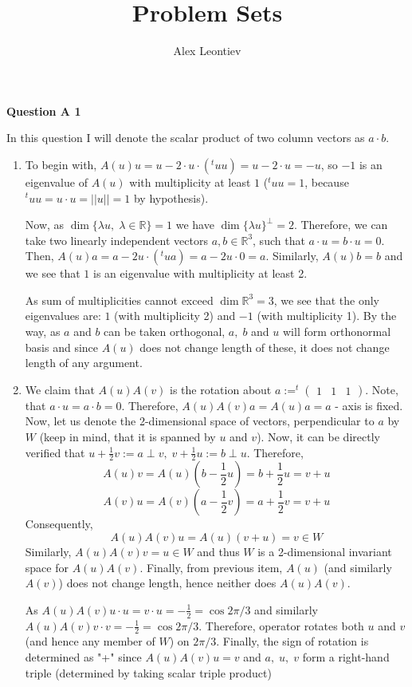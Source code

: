 \documentclass[8pt]{article} %
\title{Problem Sets}
\author{Alex Leontiev}
\newcommand{\mynorm}[1]{\left|\left|#1\right|\right|}
\newcommand{\questionA}[1]{\noindent\textbf{Question A #1}\par}
\begin{document}
\maketitle
\questionA{1}
\indent In this question I will denote the scalar product of two column vectors as $a\cdot b$.
\begin{enumerate}[label=(\arabic*)]
\item{To begin with, $A(u)u=u-2\cdot u\cdot (^t u u)=u-2\cdot u=-u$, so $-1$ is an eigenvalue of 
$A(u)$ with multiplicity at least $1$ ($^tu u=1$, because $^tu u=u\cdot u=\mynorm{u}=1$ by hypothesis).

Now, as $\dim\{\lambda u,\;\lambda\in\mathbb{R}\}=1$ we have $\dim\{\lambda u\}^\perp=2$. Therefore, we can
take two linearly independent vectors $a,b\in\mathbb{R}^3$, such that $a\cdot u=b\cdot u=0$. Then,
$A(u)a=a-2u \cdot (^tu a)=a-2u\cdot 0=a$. Similarly, $A(u)b=b$ and we see that $1$ is an eigenvalue with multiplicity at least 2.

As sum of multiplicities cannot exceed $\dim\mathbb{R}^3=3$, we see that the only eigenvalues are: $1$ (with multiplicity 2) and $-1$
(with multiplicity 1). By the way, as $a$ and $b$ can be taken orthogonal, $a,\;b$ and $u$ will form orthonormal basis and since
$A(u)$ does not change length of these, it does not change length of any argument.
}
\item{We claim that $A(u)A(v)$ is the rotation about $a:=^t \begin{pmatrix}1&1&1\end{pmatrix}$. Note, that $a\cdot u=a\cdot b=0$.
Therefore, $A(u)A(v)a=A(u)a=a$ - axis is fixed. Now, let us denote the 2-dimensional space of vectors, perpendicular to $a$ by $W$ (keep in mind,
that it is spanned by $u$ and $v$). Now, it can be directly verified that $u+\frac{1}{2}v:=a\perp v,\;v+\frac{1}{2}u:=b\perp u$. Therefore,
\[A(u)v=A(u)(b-\frac{1}{2}u)=b+\frac{1}{2}u=v+u\]
\[A(v)u=A(v)(a-\frac{1}{2}v)=a+\frac{1}{2}v=v+u\]
Consequently,
\[A(u)A(v)u=A(u)(v+u)=v\in W\]
Similarly, $A(u)A(v)v=u\in W$ and thus $W$ is a 2-dimensional invariant space for $A(u)A(v)$. Finally, from previous item, $A(u)$ (and similarly
$A(v)$) does not change length, hence neither does $A(u)A(v)$. 

As $A(u)A(v)u\cdot u=v\cdot u=-\frac{1}{2}=\cos2\pi/3$ and similarly $A(u)A(v)v\cdot v=-\frac{1}{2}=\cos2\pi/3$. Therefore, operator rotates
both $u$ and $v$ (and hence any member of $W$) on $2\pi/3$. Finally, the sign of rotation is determined as 
"+"
since $A(u)A(v)u=v$ and $a,\;u,\;v$ form a right-hand triple (determined by taking scalar triple product)
}
\end{enumerate}
\end{document}
